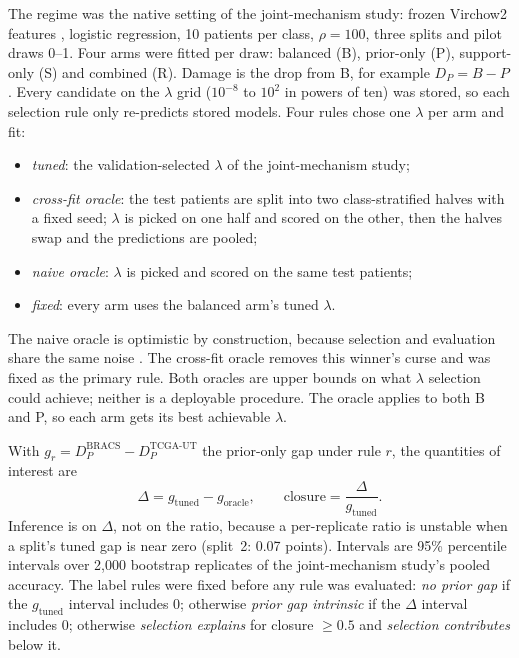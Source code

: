 \documentclass[11pt]{article}
\begin{document}
The regime was the native setting of the joint-mechanism study: frozen Virchow2 features \citep{zimmermann2024virchow2}, logistic regression, 10 patients per class, $\rho=100$, three splits and pilot draws 0--1. Four arms were fitted per draw: balanced (B), prior-only (P), support-only (S) and combined (R). Damage is the drop from B, for example $D_P = B - P$. Every candidate on the $\lambda$ grid ($10^{-8}$ to $10^{2}$ in powers of ten) was stored, so each selection rule only re-predicts stored models. Four rules chose one $\lambda$ per arm and fit:
\begin{itemize}
  \item \emph{tuned}: the validation-selected $\lambda$ of the joint-mechanism study;
  \item \emph{cross-fit oracle}: the test patients are split into two class-stratified halves with a fixed seed; $\lambda$ is picked on one half and scored on the other, then the halves swap and the predictions are pooled;
  \item \emph{naive oracle}: $\lambda$ is picked and scored on the same test patients;
  \item \emph{fixed}: every arm uses the balanced arm's tuned $\lambda$.
\end{itemize}
\noindent The naive oracle is optimistic by construction, because selection and evaluation share the same noise \citep{cawley2010overfitting}. The cross-fit oracle removes this winner's curse and was fixed as the primary rule. Both oracles are upper bounds on what $\lambda$ selection could achieve; neither is a deployable procedure. The oracle applies to both B and P, so each arm gets its best achievable $\lambda$.

With $g_r = D_P^{\text{BRACS}} - D_P^{\text{TCGA-UT}}$ the prior-only gap under rule $r$, the quantities of interest are
\begin{equation}
  \Delta = g_{\text{tuned}} - g_{\text{oracle}},
  \qquad
  \text{closure} = \frac{\Delta}{g_{\text{tuned}}}.
\end{equation}
\noindent Inference is on $\Delta$, not on the ratio, because a per-replicate ratio is unstable when a split's tuned gap is near zero (split~2: 0.07 points). Intervals are 95\% percentile intervals over 2,000 bootstrap replicates of the joint-mechanism study's pooled accuracy. The label rules were fixed before any rule was evaluated: \emph{no prior gap} if the $g_{\text{tuned}}$ interval includes 0; otherwise \emph{prior gap intrinsic} if the $\Delta$ interval includes 0; otherwise \emph{selection explains} for closure $\ge 0.5$ and \emph{selection contributes} below it.
\end{document}
